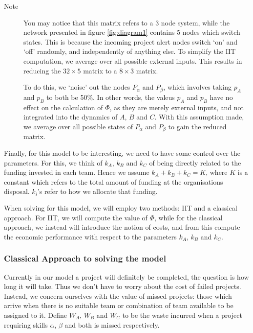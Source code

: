 \begin{description}
	\item[Note] You may notice that this matrix refers to a 3 node system, while the network presented in figure \ref{fig:diagram1} contains 5 nodes which switch states. This is because the incoming project alert nodes switch `on' and `off' randomly, and independently of anything else. To simplify the IIT computation, we average over all possible external inputs. This results in reducing the $32\times5$ matrix to a $8\times3$ matrix.
	
	To do this, we `noise' out the nodes $P_{\alpha}$ and $P_{\beta}$, which involves taking $p_A$ and $p_B$ to both be 50\%. In other words, the valeus $p_A$ and $p_B$ have no effect on the calculation of $\Phi$, as they are merely external inputs, and not integrated into the dynamics of $A$, $B$ and $C$. With this assumption made, we average over all possible states of $P_\alpha$ and $P_\beta$ to gain the reduced matrix.
\end{description}

Finally, for this model to be interesting, we need to have some control over the parameters. For this, we think of $k_A$, $k_B$ and $k_C$ of being directly related to the funding invested in each team. Hence we assume $k_A+k_B+k_C = K$, where $K$ is a constant which refers to the total amount of funding at the organisations disposal. $k_i$'s refer to how we allocate that funding.

When solving for this model, we will employ two methods: IIT and a classical approach. For IIT, we will compute the value of $\Phi$, while for the classical approach, we instead will introduce the notion of costs, and from this compute the economic performance with respect to the parameters $k_A$, $k_B$ and $k_C$. 

\subsubsection{Classical Approach to solving the model}
Currently in our model a project will definitely be completed, the question is how long it will take. Thus we don't have to worry about the cost of failed projects. Instead, we concern ourselves with the value of missed projects: those which arrive when there is no suitable team or combination of team available to be assigned to it. Define $W_A$, $W_B$ and $W_C$ to be the waste incurred when a project requiring skills $\alpha$, $\beta$ and both  is missed respectively.

